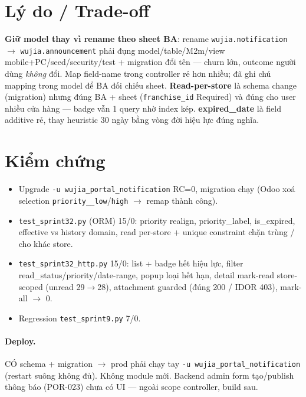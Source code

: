 \section{Lý do / Trade-off}

\textbf{Giữ model thay vì rename theo sheet BA}: rename \texttt{wujia.notification} $\rightarrow$
\texttt{wujia.announcement} phải đụng model/table/M2m/view mobile+PC/seed/security/test + migration
đổi tên --- churn lớn, outcome người dùng \emph{không} đổi. Map field-name trong controller rẻ hơn
nhiều; đã ghi chú mapping trong model để BA đối chiếu sheet. \textbf{Read-per-store} là schema change
(migration) nhưng đúng BA + sheet (\texttt{franchise\_id} Required) và đúng cho user nhiều cửa hàng
--- badge vẫn 1 query nhờ index kép. \textbf{expired\_date} là field additive rẻ, thay heuristic 30
ngày bằng vòng đời hiệu lực đúng nghĩa.

\section{Kiểm chứng}

\begin{itemize}
\item Upgrade \texttt{-u wujia\_portal\_notification} RC=0, migration chạy (Odoo xoá selection
      \texttt{priority\_\_low}/\texttt{high} $\rightarrow$ remap thành công).
\item \texttt{test\_sprint32.py} (ORM) 15/0: priority realign, priority\_label, is\_expired,
      effective vs history domain, read per-store + unique constraint chặn trùng / cho khác store.
\item \texttt{test\_sprint32\_http.py} 15/0: list + badge hết hiệu lực, filter
      read\_status/priority/date-range, popup loại hết hạn, detail mark-read store-scoped
      (unread 29$\rightarrow$28), attachment guarded (đúng 200 / IDOR 403), mark-all $\rightarrow$ 0.
\item Regression \texttt{test\_sprint9.py} 7/0.
\end{itemize}

\paragraph{Deploy.} CÓ schema + migration $\rightarrow$ prod phải chạy tay
\texttt{-u wujia\_portal\_notification} (restart suông không đủ). Không module mới. Backend admin form
tạo/publish thông báo (POR-023) chưa có UI --- ngoài scope controller, build sau.
